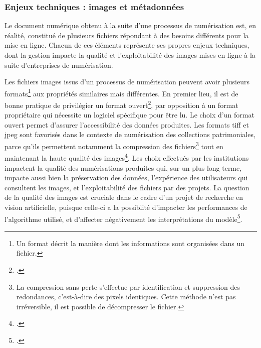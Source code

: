     \subsubsection{Enjeux techniques : images et métadonnées}
	Le document numérique obtenu à la suite d'une processus de numérisation est, en réalité, constitué de plusieurs fichiers répondant à des besoins différents pour la mise en ligne. Chacun de ces éléments représente ses propres enjeux techniques, dont la gestion impacte la qualité et l'exploitabilité des images mises en ligne à la suite d'entreprises de numérisation.
	
	Les fichiers images issus d'un processus de numérisation peuvent avoir plusieurs formats\footnote{Un format décrit la manière dont les informations sont organisées dans un fichier.} aux propriétés similaires mais différentes. En premier lieu, il est de bonne pratique de privilégier un format ouvert\footcite{besseNumerisationMasseVers2019}, par opposition à un format propriétaire qui nécessite un logiciel spécifique pour être lu. Le choix d'un format ouvert permet d'assurer l'accessibilité des données produites. Les formats \acrfull{tiff} et \acrfull{jpeg} sont favorisés dans le contexte de numérisation des collections patrimoniales, parce qu'ils permettent notamment la compression des fichiers\footnote{La compression sans perte s'effectue par identification et suppression des redondances, c'est-à-dire des pixels identiques. Cette méthode n'est pas irréversible, il est possible de décompresser le fichier.} tout en maintenant la haute qualité des images\footcite{DigitalImages2020}. Les choix effectués par les institutions impactent la qualité des numérisations produites qui, sur un plus long terme, impacte aussi bien la préservation des données, l'expérience des utilisateurs qui consultent les images, et l'exploitabilité des fichiers par des projets. La question de la qualité des images est cruciale dans le cadre d'un projet de recherche en vision artificielle, puisque celle-ci a la possiblité d'impacter les performances de l'algorithme utilisé, et d'affecter négativement les interprétations du modèle\footcite{bergstromImageQualityComputer2023}.
	
